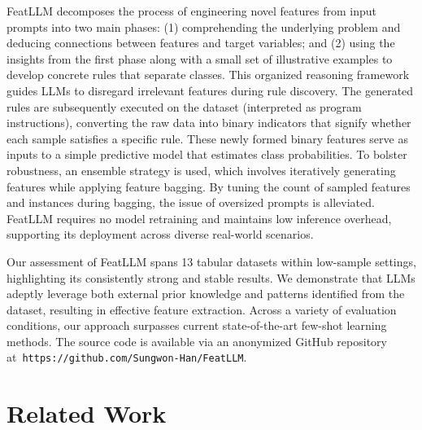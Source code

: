 \textsf{FeatLLM} decomposes the process of engineering novel features from input prompts into two main phases: (1) comprehending the underlying problem and deducing connections between features and target variables; and (2) using the insights from the first phase along with a small set of illustrative examples to develop concrete rules that separate classes. This organized reasoning framework guides LLMs to disregard irrelevant features during rule discovery. The generated rules are subsequently executed on the dataset (interpreted as program instructions), converting the raw data into binary indicators that signify whether each sample satisfies a specific rule. These newly formed binary features serve as inputs to a simple predictive model that estimates class probabilities. To bolster robustness, an ensemble strategy is used, which involves iteratively generating features while applying feature bagging. By tuning the count of sampled features and instances during bagging, the issue of oversized prompts is alleviated. \textsf{FeatLLM} requires no model retraining and maintains low inference overhead, supporting its deployment across diverse real-world scenarios.

Our assessment of \textsf{FeatLLM} spans 13 tabular datasets within low-sample settings, highlighting its consistently strong and stable results. We demonstrate that LLMs adeptly leverage both external prior knowledge and patterns identified from the dataset, resulting in effective feature extraction. Across a variety of evaluation conditions, our approach surpasses current state-of-the-art few-shot learning methods. The source code is available via an anonymized GitHub repository at~\texttt{https://github.com/Sungwon-Han/FeatLLM}.

\section{Related Work}

